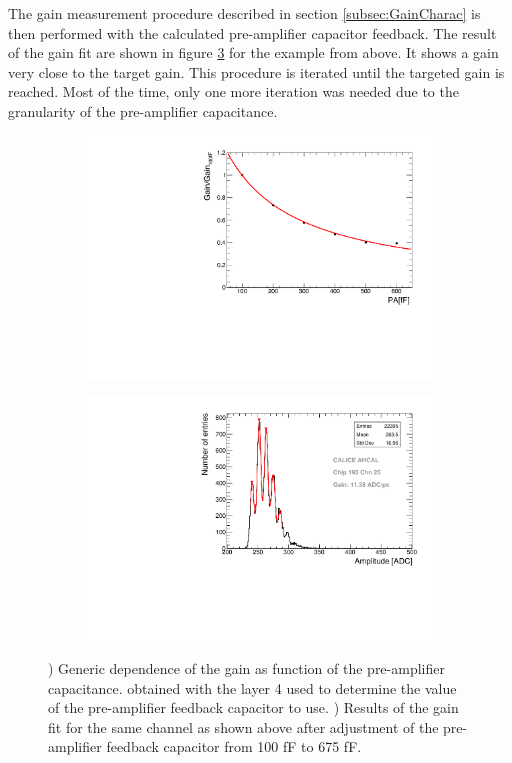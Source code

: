 The gain measurement procedure described in section \ref{subsec:GainCharac} is then performed with the calculated pre-amplifier capacitor feedback. The result of the gain fit are shown in figure \ref{fig:Gain675fF} for the example from above. It shows a gain very close to the target gain. This procedure is iterated until the targeted gain is reached. Most of the time, only one more iteration was needed due to the granularity of the pre-amplifier capacitance.

\begin{figure}[htbp!]
  \centering
  \begin{subfigure}[t]{0.49\textwidth}
    \includegraphics[width=1.\linewidth]{../Thesis_Plots/Commissioning/Plots/GainvsPA.pdf}
    \caption{} \label{fig:PA_curve}
  \end{subfigure}
  \hfill
  \begin{subfigure}[t]{0.49\textwidth}
    \includegraphics[width=1.\linewidth]{../Thesis_Plots/Commissioning/Plots/Gain675fF_MainzHBU4.pdf}
    \caption{} \label{fig:Gain675fF}
  \end{subfigure}
  \caption{) Generic dependence of the gain as function of the pre-amplifier capacitance. obtained with the layer 4 used to determine the value of the pre-amplifier feedback capacitor to use. ) Results of the gain fit for the same channel as shown above after adjustment of the pre-amplifier feedback capacitor from 100 fF to 675 fF.}
\end{figure}

